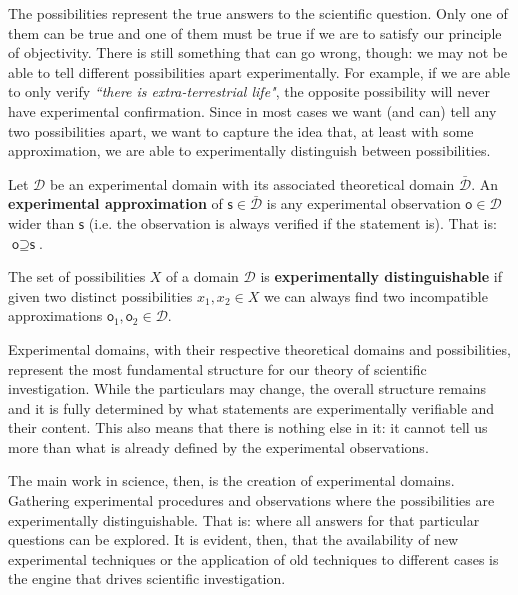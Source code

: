 \documentclass[11pt,letterpaper,fleqn]{memoir} %
\begin{document}
The possibilities represent the true answers to the scientific question. Only one of them can be true and one of them must be true if we are to satisfy our principle of objectivity. There is still something that can go wrong, though: we may not be able to tell different possibilities apart experimentally. For example, if we are able to only verify \emph{``there is extra-terrestrial life"}, the opposite possibility will never have experimental confirmation. Since in most cases we want (and can) tell any two possibilities apart, we want to capture the idea that, at least with some approximation, we are able to experimentally distinguish between possibilities.

\begin{mathSection}
\begin{defn}
	Let $\mathcal{D}$ be an experimental domain with its associated theoretical domain $\bar{\mathcal{D}}$. An \textbf{experimental approximation} of $\textsf{s} \in \bar{\mathcal{D}}$ is any experimental observation $\textsf{o} \in \mathcal{D}$ wider than $\textsf{s}$ (i.e. the observation is always verified if the statement is). That is: $\textsf{o} \supseteq \textsf{s}$.
\end{defn}

\begin{defn}
	The set of possibilities $X$ of a domain $\mathcal{D}$ is \textbf{experimentally distinguishable} if given two distinct possibilities $x_1, x_2 \in X$ we can always find two incompatible approximations $\textsf{o}_1, \textsf{o}_2 \in \mathcal{D}$.
\end{defn}
\end{mathSection}

Experimental domains, with their respective theoretical domains and possibilities, represent the most fundamental structure for our theory of scientific investigation. While the particulars may change, the overall structure remains and it is fully determined by what statements are experimentally verifiable and their content. This also means that there is nothing else in it: it cannot tell us more than what is already defined by the experimental observations.

The main work in science, then, is the creation of experimental domains. Gathering experimental procedures and observations where the possibilities are experimentally distinguishable. That is: where all answers for that particular questions can be explored. It is evident, then, that the availability of new experimental techniques or the application of old techniques to different cases is the engine that drives scientific investigation.
\end{document}
